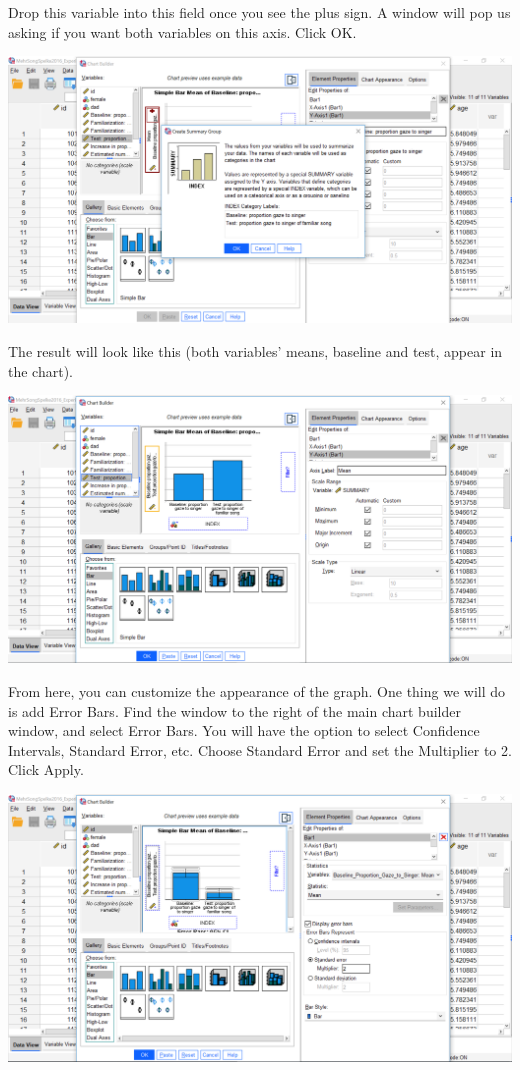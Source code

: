 \documentclass[]{book}
\begin{document}
Drop this variable into this field once you see the plus sign. A window
will pop us asking if you want both variables on this axis. {Click OK}.

\includegraphics{img/6.4.26.png}

The result will look like this (both variables' means, baseline and
test, appear in the chart).

\includegraphics{img/6.4.27.png}

From here, you can customize the appearance of the graph. One thing we
will do is add Error Bars. Find the window to the right of the main
chart builder window, and select {Error Bars}. You will have the option
to select Confidence Intervals, Standard Error, etc. Choose {Standard
Error} and set the {Multiplier to 2}. Click {Apply}.

\includegraphics{img/6.4.28.png}
\end{document}
